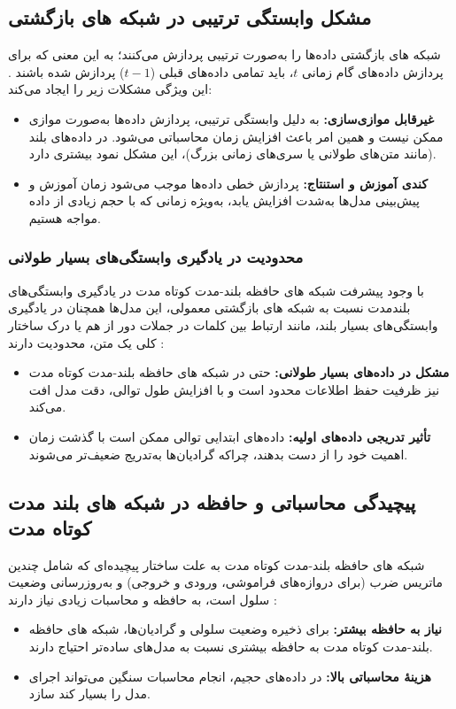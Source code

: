 \subsection{مشکل وابستگی ترتیبی در شبکه های بازگشتی}
شبکه های بازگشتی داده‌ها را به‌صورت ترتیبی پردازش می‌کنند؛ به این معنی که برای پردازش داده‌های گام زمانی \( t \)، باید تمامی داده‌های قبلی (\( t-1 \)) پردازش شده باشند
\cite{rumelhart1986learning,hochreiter1997long}.
این ویژگی مشکلات زیر را ایجاد می‌کند:
\begin{itemize}
	\item \textbf{غیرقابل موازی‌سازی:}  
	به دلیل وابستگی ترتیبی، پردازش داده‌ها به‌صورت موازی ممکن نیست و همین امر باعث افزایش زمان محاسباتی می‌شود. در داده‌های بلند (مانند متن‌های طولانی یا سری‌های زمانی بزرگ)، این مشکل نمود بیشتری دارد.
	
	\item \textbf{کندی آموزش و استنتاج:}  
	پردازش خطی داده‌ها موجب می‌شود زمان آموزش و پیش‌بینی مدل‌ها به‌شدت افزایش یابد، به‌ویژه زمانی که با حجم زیادی از داده مواجه هستیم.
\end{itemize}

\subsubsection{محدودیت در یادگیری وابستگی‌های بسیار طولانی}
با وجود پیشرفت شبکه های حافظه بلند-مدت کوتاه مدت در یادگیری وابستگی‌های بلندمدت نسبت به شبکه های بازگشتی معمولی، این مدل‌ها همچنان در یادگیری وابستگی‌های بسیار بلند، مانند ارتباط بین کلمات در جملات دور از هم یا درک ساختار کلی یک متن، محدودیت دارند
\cite{hochreiter1998vanishing}:
\begin{itemize}
	\item \textbf{مشکل در داده‌های بسیار طولانی:}  
	حتی در شبکه های حافظه بلند-مدت کوتاه مدت  نیز ظرفیت حفظ اطلاعات محدود است و با افزایش طول توالی، دقت مدل افت می‌کند.
	
	\item \textbf{تأثیر تدریجی داده‌های اولیه:}  
	داده‌های ابتدایی توالی ممکن است با گذشت زمان اهمیت خود را از دست بدهند، چراکه گرادیان‌ها به‌تدریج ضعیف‌تر می‌شوند.
\end{itemize}

\subsection{ پیچیدگی محاسباتی و حافظه در شبکه های بلند مدت کوتاه مدت}
شبکه های حافظه بلند-مدت کوتاه مدت به علت ساختار پیچیده‌ای که شامل چندین ماتریس ضرب (برای دروازه‌های فراموشی، ورودی و خروجی) و به‌روزرسانی وضعیت سلول است، به حافظه و محاسبات زیادی نیاز دارند
\cite{goodfellow2016deep}:
\begin{itemize}
	\item \textbf{نیاز به حافظه بیشتر:}  
	برای ذخیره وضعیت سلولی و گرادیان‌ها، شبکه های حافظه بلند-مدت کوتاه مدت  به حافظه بیشتری نسبت به مدل‌های ساده‌تر احتیاج دارند.
	
	\item \textbf{هزینهٔ محاسباتی بالا:}  
	در داده‌های حجیم، انجام محاسبات سنگین می‌تواند اجرای مدل را بسیار کند سازد.
\end{itemize}

